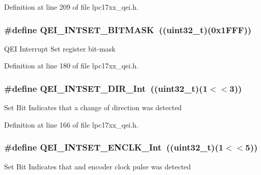 \-Definition at line 209 of file lpc17xx\-\_\-qei.\-h.

\hypertarget{group___q_e_i___private___macros_gab1cbe2e1fc40fe03878509471241e690}{
\subsubsection[{\-Q\-E\-I\-\_\-\-I\-N\-T\-S\-E\-T\-\_\-\-B\-I\-T\-M\-A\-S\-K}]{\setlength{\rightskip}{0pt plus 5cm}\#define {\bf \-Q\-E\-I\-\_\-\-I\-N\-T\-S\-E\-T\-\_\-\-B\-I\-T\-M\-A\-S\-K}~((uint32\-\_\-t)(0x1\-F\-F\-F))}}\label{group___q_e_i___private___macros_gab1cbe2e1fc40fe03878509471241e690}
\-Q\-E\-I \-Interrupt \-Set register bit-\/mask 

\-Definition at line 180 of file lpc17xx\-\_\-qei.\-h.

\hypertarget{group___q_e_i___private___macros_ga11aa7e43cb9a1c77c9164ebb45ca449d}{
\subsubsection[{\-Q\-E\-I\-\_\-\-I\-N\-T\-S\-E\-T\-\_\-\-D\-I\-R\-\_\-\-Int}]{\setlength{\rightskip}{0pt plus 5cm}\#define {\bf \-Q\-E\-I\-\_\-\-I\-N\-T\-S\-E\-T\-\_\-\-D\-I\-R\-\_\-\-Int}~((uint32\-\_\-t)(1$<$$<$3))}}\label{group___q_e_i___private___macros_ga11aa7e43cb9a1c77c9164ebb45ca449d}
\-Set \-Bit \-Indicates that a change of direction was detected 

\-Definition at line 166 of file lpc17xx\-\_\-qei.\-h.

\hypertarget{group___q_e_i___private___macros_ga1068c7845806056ae167fd4b6becb93f}{
\subsubsection[{\-Q\-E\-I\-\_\-\-I\-N\-T\-S\-E\-T\-\_\-\-E\-N\-C\-L\-K\-\_\-\-Int}]{\setlength{\rightskip}{0pt plus 5cm}\#define {\bf \-Q\-E\-I\-\_\-\-I\-N\-T\-S\-E\-T\-\_\-\-E\-N\-C\-L\-K\-\_\-\-Int}~((uint32\-\_\-t)(1$<$$<$5))}}\label{group___q_e_i___private___macros_ga1068c7845806056ae167fd4b6becb93f}
\-Set \-Bit \-Indicates that and encoder clock pulse was detected 

